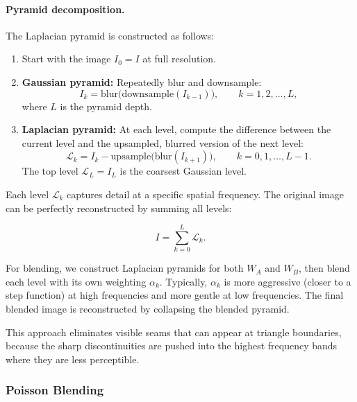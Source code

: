 \paragraph{Pyramid decomposition.} The Laplacian pyramid is constructed as follows:

\begin{enumerate}
    \item Start with the image $I_0 = I$ at full resolution.
    \item \textbf{Gaussian pyramid:} Repeatedly blur and downsample:
          \begin{equation}
              I_{k} = \text{blur}\bigl(\text{downsample}(I_{k-1})\bigr), \qquad k = 1, 2, \ldots, L,
          \end{equation}
          where $L$ is the pyramid depth.
    \item \textbf{Laplacian pyramid:} At each level, compute the difference between the current
          level and the upsampled, blurred version of the next level:
          \begin{equation}
              \mathcal{L}_k = I_k - \text{upsample}\bigl(\text{blur}(I_{k+1})\bigr),
              \qquad k = 0, 1, \ldots, L - 1.
          \end{equation}
          The top level $\mathcal{L}_L = I_L$ is the coarsest Gaussian level.
\end{enumerate}

Each level $\mathcal{L}_k$ captures detail at a specific spatial frequency. The original image
can be perfectly reconstructed by summing all levels:

\begin{equation}
    I = \sum_{k=0}^{L} \mathcal{L}_k.
\end{equation}

For blending, we construct Laplacian pyramids for both $W_A$ and $W_B$, then blend each level
with its own weighting $\alpha_k$. Typically, $\alpha_k$ is more aggressive (closer to a
step function) at high frequencies and more gentle at low frequencies. The final blended image
is reconstructed by collapsing the blended pyramid.

This approach eliminates visible seams that can appear at triangle boundaries, because the
sharp discontinuities are pushed into the highest frequency bands where they are less
perceptible.

\subsubsection{Poisson Blending}

